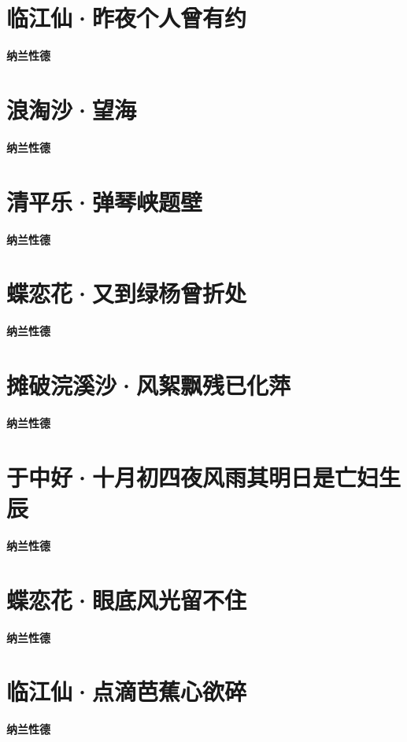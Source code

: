 \documentclass[12pt,a4paper]{ctexbook}
\begin{document}
\section{临江仙·昨夜个人曾有约}
\textbf{纳兰性德}\par\vspace{0.5em}

\section{浪淘沙·望海}
\textbf{纳兰性德}\par\vspace{0.5em}

\section{清平乐·弹琴峡题壁}
\textbf{纳兰性德}\par\vspace{0.5em}

\section{蝶恋花·又到绿杨曾折处}
\textbf{纳兰性德}\par\vspace{0.5em}

\section{摊破浣溪沙·风絮飘残已化萍}
\textbf{纳兰性德}\par\vspace{0.5em}

\section{于中好·十月初四夜风雨其明日是亡妇生辰}
\textbf{纳兰性德}\par\vspace{0.5em}

\section{蝶恋花·眼底风光留不住}
\textbf{纳兰性德}\par\vspace{0.5em}

\section{临江仙·点滴芭蕉心欲碎}
\textbf{纳兰性德}\par\vspace{0.5em}
\end{document}
